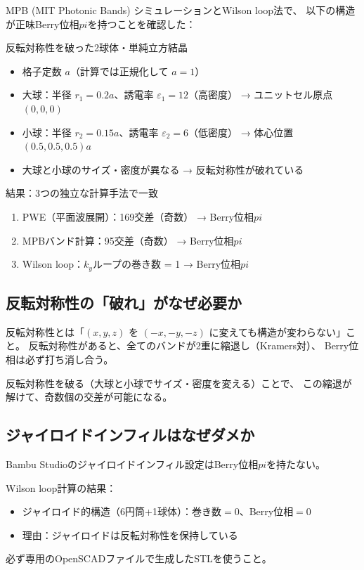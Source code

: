 \documentclass[11pt,a4paper]{article}
\def\pi{pi}%
\def\textbf#1{#1}%
\begin{document}
MPB (MIT Photonic Bands) シミュレーションとWilson loop法で、
以下の構造が正味Berry位相$\pi$を持つことを確認した：

\begin{tcolorbox}[colback=green!5,colframe=green!60!black,title=Wilson loop確認済み構造]
\textbf{反転対称性を破った2球体・単純立方結晶}
\begin{itemize}
\item 格子定数 $a$（計算では正規化して $a=1$）
\item 大球：半径 $r_1 = 0.2a$、誘電率 $\varepsilon_1 = 12$（高密度）
  → ユニットセル原点 $(0,0,0)$
\item 小球：半径 $r_2 = 0.15a$、誘電率 $\varepsilon_2 = 6$（低密度）
  → 体心位置 $(0.5, 0.5, 0.5)a$
\item 大球と小球のサイズ・密度が異なる → \textbf{反転対称性が破れている}
\end{itemize}

\textbf{結果}：3つの独立な計算手法で一致
\begin{enumerate}
\item PWE（平面波展開）：169交差（奇数） → Berry位相$\pi$
\item MPBバンド計算：95交差（奇数） → Berry位相$\pi$
\item Wilson loop：$k_y$ループの巻き数 = 1 → Berry位相$\pi$
\end{enumerate}
\end{tcolorbox}

\subsection{反転対称性の「破れ」がなぜ必要か}

反転対称性とは「$(x,y,z)$ を $(-x,-y,-z)$ に変えても構造が変わらない」こと。
反転対称性があると、全てのバンドが2重に縮退し（Kramers対）、
Berry位相は必ず打ち消し合う。

反転対称性を破る（大球と小球でサイズ・密度を変える）ことで、
この縮退が解けて、奇数個の交差が可能になる。

\subsection{ジャイロイドインフィルはなぜダメか}

\begin{tcolorbox}[colback=red!5,colframe=red!60!black,title=重要な警告]
Bambu Studioのジャイロイドインフィル設定は\textbf{Berry位相$\pi$を持たない}。

Wilson loop計算の結果：
\begin{itemize}
\item ジャイロイド的構造（6円筒+1球体）：巻き数$= 0$、Berry位相$= 0$
\item 理由：ジャイロイドは反転対称性を\textbf{保持}している
\end{itemize}

\textbf{必ず専用のOpenSCADファイルで生成したSTLを使うこと。}
\end{tcolorbox}
\end{document}
